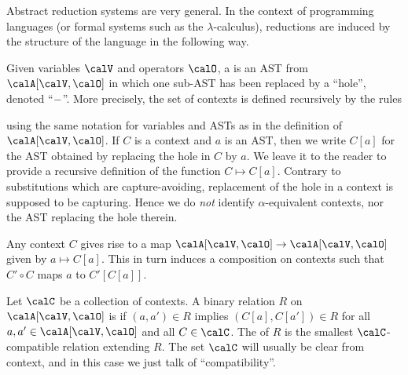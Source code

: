Abstract reduction systems are very general. In the context of programming languages (or formal systems such as the $\lambda$-calculus), reductions are induced by the structure of the language in the following way.

Given variables $\setVarAST$ and operators $\setOp$, a  is an AST from $\setAST{\setVarAST}{\setOp}$ in which one sub-AST has been replaced by a \enquote{hole}, denoted \enquote{${-}$}. More precisely, the set of contexts is defined recursively by the rules
%
%
using the same notation for variables and ASTs as in the definition of $\setAST{\setVarAST}{\setOp}$. If $C$ is a context and $a$ is an AST, then we write $C[a]$ for the AST obtained by replacing the hole in $C$ by $a$. We leave it to the reader to provide a recursive definition of the function $C \mapsto C[a]$. Contrary to substitutions which are capture-avoiding, replacement of the hole in a context is supposed to be capturing. Hence we do \emph{not} identify $\alpha$-equivalent contexts, nor the AST replacing the hole therein.

Any context $C$ gives rise to a map $\setAST{\setVarAST}{\setOp} \to \setAST{\setVarAST}{\setOp}$ given by $a \mapsto C[a]$. This in turn induces a composition on contexts such that $C' \circ C$ maps $a$ to $C'[C[a]]$.

Let $\calC$ be a collection of contexts. A binary relation $R$ on $\setAST{\setVarAST}{\setOp}$ is  if $(a,a') \in R$ implies $(C[a],C[a']) \in R$ for all $a,a' \in \setAST{\setVarAST}{\setOp}$ and all $C \in \calC$. The  of $R$ is the smallest $\calC$-compatible relation extending $R$. The set $\calC$ will usually be clear from context, and in this case we just talk of \enquote{compatibility}.

